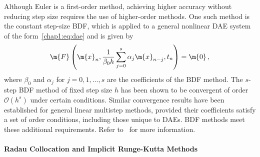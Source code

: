 Although Euler is a first-order method, achieving higher accuracy without reducing step size requires the use of higher-order methods. One such method is the constant step-size \ac{BDF}, which is applied to a general nonlinear \ac{DAE} system of the form~\eqref{chap1:eq:dae} and is given by
%
\begin{equation*}
  \m{F}\left(\m{x}_n, \dfrac{1}{\beta_0 h} \sum_{j=0}^{s} \alpha_j \m{x}_{n-j}, t_n\right) = \m{0} \, \text{,}
\end{equation*}
%
where $\beta_0$ and $\alpha_j$ for $j = 0, 1, \dots, s$ are the coefficients of the \ac{BDF} method. The $s$-step \ac{BDF} method of fixed step size $h$ has been shown to be convergent of order $\mathcal{O}(h^s)$ under certain conditions. Similar convergence results have been established for general linear multistep methods, provided their coefficients satisfy a set of order conditions, including those unique to \acp{DAE}. \ac{BDF} methods meet these additional requirements. Refer to~\cite{brenan1995numerical} for more information.

\paragraph{Radau Collocation and Implicit Runge-Kutta Methods}

